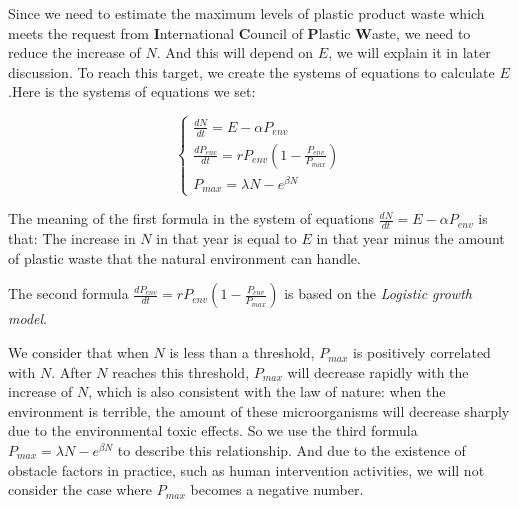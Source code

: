 \documentclass{mcmthesis}
\begin{document}
		Since we need to estimate the maximum levels of plastic product waste which meets the request from \textbf{I}nternational \textbf{C}ouncil of \textbf{P}lastic \textbf{W}aste, we need to reduce the increase of $N$. And this will depend on $E$, we will explain it in later discussion. To reach this target, we create the systems of equations to calculate $E$.Here is the systems of equations we set:
	    \begin{spacing}{1.5}
	    \begin{equation}
		  \begin{cases}%
		  \frac{dN}{dt}=E-\alpha P_{env} \\
		  
		  \frac{dP_{env}}{dt}=rP_{env}(1-\frac{P_{env}}{P_{max}})\\
		  P_{max}=\lambda N-e^{\beta N}

		    \end{cases}
	     \end{equation}
		\end{spacing}
	
		The meaning of the first formula in the system of equations  $\frac{dN}{dt}=E-\alpha P_{env}$ is that: The increase in $N$ in that year is equal to $E$ in that year minus the amount of plastic waste that the natural environment can handle.
	   
		The second formula $\frac{dP_{env}}{dt}=rP_{env}(1-\frac{P_{env}}{P_{max}})$ is based on the \textit{Logistic growth model}. 

		We consider that when $N$ is less than a threshold, $P_{max}$ is positively correlated with $N$. After $N$ reaches this threshold, $P_{max}$ will decrease rapidly with the increase of $N$, which is also consistent with the law of nature: when the environment is terrible, the amount of these microorganisms will decrease sharply due to the environmental toxic effects. So we use the third formula $P_{max}=\lambda N-e^{\beta N}$ to describe this relationship. And due to the existence of obstacle factors in practice, such as human intervention activities, we will not consider the case where $P_{max}$ becomes a negative number.
	 
	
\end{document}
